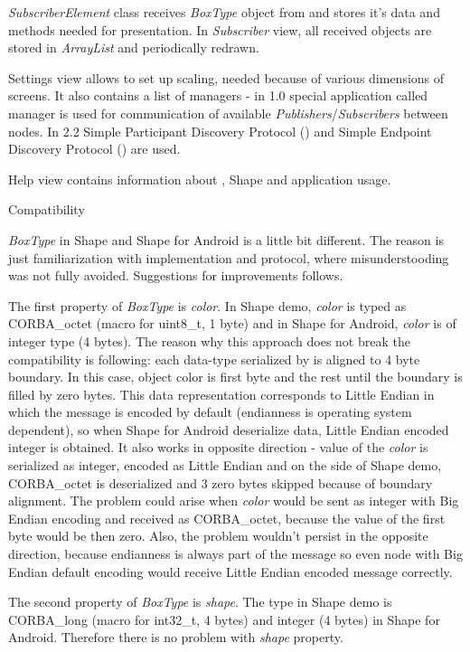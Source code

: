 {\em SubscriberElement} class receives {\em BoxType} object from  and stores it's data and methods needed for presentation. In {\em Subscriber} view, all received objects are stored in {\em ArrayList} and periodically redrawn.

Settings view allows to set up scaling, needed because of various dimensions of screens. It also contains a list of managers - in  1.0 special application called manager is used for communication of available {\em Publishers}/{\em Subscribers} between nodes. In  2.2 Simple Participant Discovery Protocol () and Simple Endpoint Discovery Protocol () are used.

Help view contains information about , Shape and application usage.

\sec Compatibility

{\em BoxType} in Shape and Shape for Android is a little bit different. The reason is just familiarization with  implementation and  protocol, where misunderstooding was not fully avoided. Suggestions for improvements follows.

The first property of {\em BoxType} is {\em color}. In Shape demo, {\em color} is typed as CORBA\_octet (macro for uint8\_t, 1 byte) and in Shape for Android, {\em color} is of integer type (4 bytes). The reason why this approach does not break the compatibility is following: each data-type serialized by  is aligned to 4 byte boundary. In this case, object color is first byte and the rest until the boundary is filled by zero bytes. This data representation corresponds to Little Endian in which the message is encoded by default (endianness is operating system dependent), so when Shape for Android deserialize data, Little Endian encoded integer is obtained. It also works in opposite direction - value of the {\em color} is serialized as integer, encoded as Little Endian and on the side of Shape demo, CORBA\_octet is deserialized and 3 zero bytes skipped because of boundary alignment. The problem could arise when {\em color} would be sent as integer with Big Endian encoding and received as CORBA\_octet, because the value of the first byte would be then zero. Also, the problem wouldn't persist in the opposite direction, because endianness is always part of the  message so even node with Big Endian default encoding would receive Little Endian encoded message correctly.

The second property of {\em BoxType} is {\em shape}. The type in Shape demo is CORBA\_long (macro for int32\_t, 4 bytes) and integer (4 bytes) in Shape for Android. Therefore there is no problem with {\em shape} property.

